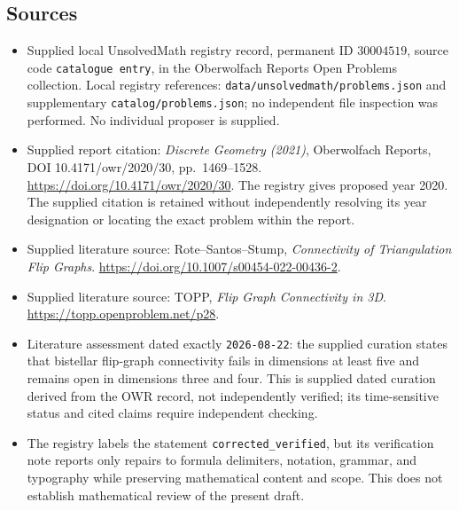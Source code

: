 \documentclass[11pt]{article}
\begin{document}
\subsection{Sources}
\begin{itemize}
\item Supplied local UnsolvedMath registry record, permanent ID \(30004519\), source code \texttt{catalogue entry}, in the Oberwolfach Reports Open Problems collection. Local registry references: \texttt{data/unsolvedmath/problems.json} and supplementary \texttt{catalog/problems.json}; no independent file inspection was performed. No individual proposer is supplied.
\item Supplied report citation: \emph{Discrete Geometry (2021)}, Oberwolfach Reports, DOI 10.4171/owr/2020/30, pp.\ 1469--1528. \url{https://doi.org/10.4171/owr/2020/30}. The registry gives proposed year 2020. The supplied citation is retained without independently resolving its year designation or locating the exact problem within the report.
\item Supplied literature source: Rote--Santos--Stump, \emph{Connectivity of Triangulation Flip Graphs}. \url{https://doi.org/10.1007/s00454-022-00436-2}.
\item Supplied literature source: TOPP, \emph{Flip Graph Connectivity in 3D}. \url{https://topp.openproblem.net/p28}.
\item Literature assessment dated exactly \texttt{2026-08-22}: the supplied curation states that bistellar flip-graph connectivity fails in dimensions at least five and remains open in dimensions three and four. This is supplied dated curation derived from the OWR record, not independently verified; its time-sensitive status and cited claims require independent checking.
\item The registry labels the statement \texttt{corrected\_verified}, but its verification note reports only repairs to formula delimiters, notation, grammar, and typography while preserving mathematical content and scope. This does not establish mathematical review of the present draft.
\end{itemize}
\end{document}
